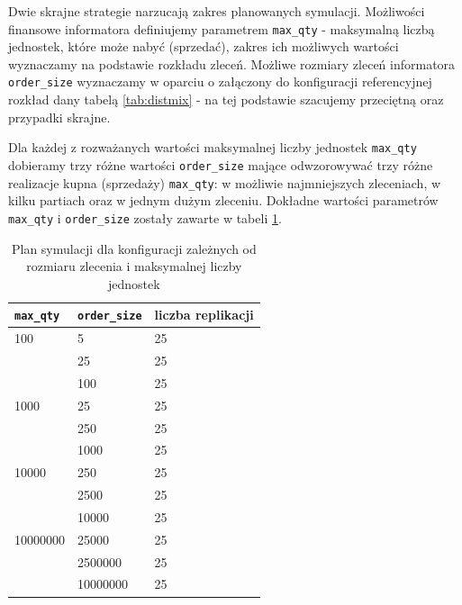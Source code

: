Dwie skrajne strategie narzucają zakres planowanych symulacji. Możliwości finansowe informatora definiujemy parametrem \texttt{max\_qty} - maksymalną liczbą jednostek, które może nabyć (sprzedać), zakres ich możliwych wartości wyznaczamy na podstawie rozkładu zleceń. Możliwe rozmiary zleceń informatora \texttt{order\_size} wyznaczamy w oparciu o załączony do konfiguracji referencyjnej rozkład dany tabelą \ref{tab:distmix} - na tej podstawie szacujemy przeciętną oraz przypadki skrajne. 

Dla każdej z rozważanych wartości maksymalnej liczby jednostek \texttt{max\_qty} dobieramy trzy różne wartości \texttt{order\_size} mające odwzorowywać trzy różne realizacje kupna (sprzedaży) \texttt{max\_qty}: w możliwie najmniejszych zleceniach, w kilku partiach oraz w jednym dużym zleceniu. Dokładne wartości parametrów \texttt{max\_qty} i \texttt{order\_size} zostały zawarte w tabeli \ref{tab:simplan1}.
\begin{table}
\caption{Plan symulacji dla konfiguracji zależnych od rozmiaru zlecenia i maksymalnej liczby jednostek } 
\label{tab:simplan1}
\begin{center}
\begin{tabular}{|p{2cm}|p{2cm}|p{2cm}|}
\hline
\textbf{\texttt{max\_qty}} & \textbf{\texttt{order\_size}} & \textbf{liczba replikacji} \\
\hline 
100 & 5 & 25 \\
 & 25 & 25 \\
 & 100 & 25 \\
\hline
1000 & 25 & 25 \\
 & 250 & 25 \\
 & 1000 & 25 \\
\hline
10000 & 250 & 25 \\
 & 2500 & 25 \\
 & 10000 & 25 \\
\hline
10000000 & 25000 & 25 \\
 & 2500000 & 25 \\
 & 10000000 & 25 \\
\hline
\end{tabular} 
\end{center}
\end{table}
